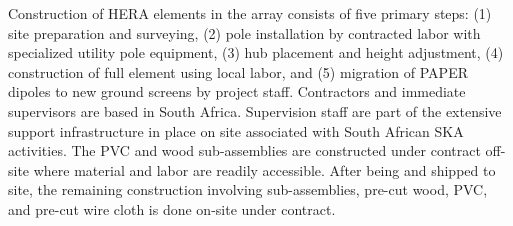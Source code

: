 \documentclass[preprint]{aastex}
\begin{document}
Construction of HERA elements in the array consists of five primary steps: 
(1) site preparation and surveying, (2) pole installation by contracted labor with specialized utility pole equipment,
(3) hub placement and height adjustment, (4) construction of full element using local labor,
and (5) migration of PAPER dipoles to new ground screens by project staff.
Contractors and immediate supervisors are based in South Africa.  Supervision staff 
are part of the extensive support infrastructure in place on site associated with South African SKA activities.
The PVC and wood sub-assemblies 
are constructed under contract off-site where material and labor are readily accessible.  After being and shipped to site, the
remaining construction involving sub-assemblies, pre-cut wood, PVC, and pre-cut wire cloth 
is done on-site under contract.  


\end{document}
